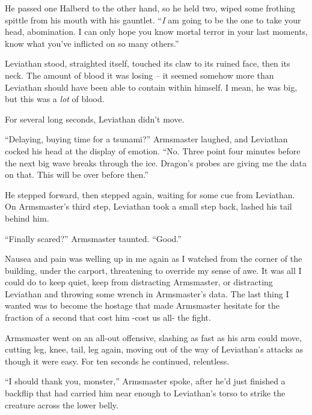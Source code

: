 He passed one Halberd to the other hand, so he held two, wiped some frothing spittle from his mouth with his gauntlet.  ``\emph{I} am going to be the one to take your head, abomination.  I can only hope you know mortal terror in your last moments, know what you've inflicted on so many others.''



Leviathan stood, straighted itself, touched its claw to its ruined face, then its neck.  The amount of blood it was losing – it seemed somehow more than Leviathan should have been able to contain within himself.  I mean, he was big, but this was a \emph{lot} of blood.



For several long seconds, Leviathan didn't move.



``Delaying, buying time for a tsunami?'' Armsmaster laughed, and Leviathan cocked his head at the display of emotion.  ``No.  Three point four minutes before the next big wave breaks through the ice.  Dragon's probes are giving me the data on that.  This will be over before then.''



He stepped forward, then stepped again, waiting for some cue from Leviathan.  On Armsmaster's third step, Leviathan took a small step back, lashed his tail behind him.



``Finally scared?'' Armsmaster taunted.  ``Good.''



Nausea and pain was welling up in me again as I watched from the corner of the building, under the carport, threatening to override my sense of awe.  It was all I could do to keep quiet, keep from distracting Armsmaster, or distracting Leviathan and throwing some wrench in Armsmaster's data.  The last thing I wanted was to become the hostage that made Armsmaster hesitate for the fraction of a second that cost him -cost us all-  the fight.



Armsmaster went on an all-out offensive, slashing as fast as his arm could move, cutting leg, knee, tail, leg again, moving out of the way of Leviathan's attacks as though it were easy.  For ten seconds he continued, relentless.



``I should thank you, monster,'' Armsmaster spoke, after he'd just finished a backflip that had carried him near enough to Leviathan's torso to strike the creature across the lower belly.



